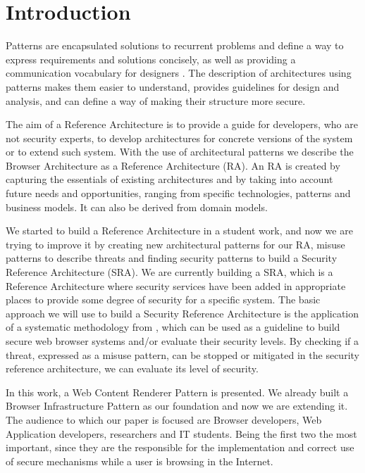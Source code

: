 \documentclass{sig-alternate-05-2015}
\begin{document}





\section{Introduction}
Patterns are encapsulated solutions to recurrent problems and define a way to express requirements and solutions concisely, as well as providing a communication vocabulary for designers \cite{gamma1994design}. The description of architectures using patterns makes them easier to understand, provides guidelines for design and analysis, and can define a way of making their structure more secure.

The aim of a Reference Architecture is to provide a guide for developers, who are not security experts, to develop architectures for concrete versions of the system or to extend such system. With the use of architectural patterns we describe the Browser Architecture as a Reference Architecture (RA). An RA is created by capturing the essentials of existing architectures and by taking into account future needs and opportunities, ranging from specific technologies, patterns and business models. It can also be derived from domain models.

We started to build a Reference Architecture in a student work, and now we are trying to improve it by creating new architectural patterns for our RA, misuse patterns to describe threats and finding security patterns to build a Security Reference Architecture (SRA). We are currently building a SRA, which is a Reference Architecture where security services have been added in appropriate places to provide some degree of security for a specific system. The basic approach we will use to build a Security Reference Architecture is the application of a systematic methodology from \cite{fernandez2006methodology,Fernandez2011,Fernandez2015}, which can be used as a guideline to build secure web browser systems and/or evaluate their security levels. By checking if a threat, expressed as a misuse pattern, can be stopped or mitigated in the security reference architecture, we can evaluate its level of security.

In this work, a Web Content Renderer Pattern is presented. We already built a Browser Infrastructure Pattern as our foundation and now we are extending it. The audience to which our paper is focused are Browser developers, Web Application developers, researchers and IT students. Being the first two the most important, since they are the responsible for the implementation and correct use of secure mechanisms while a user is browsing in the Internet. 
\end{document}
